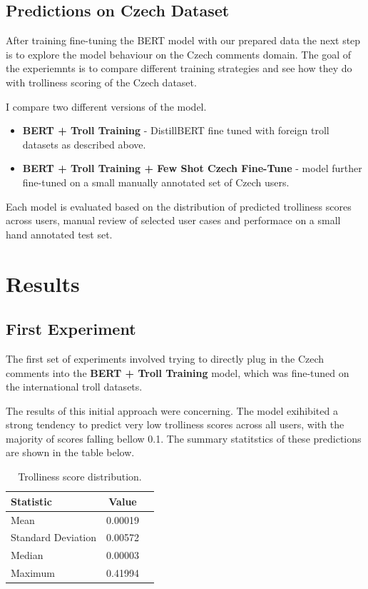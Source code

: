 \documentclass[twoside]{ctuthesis}
\theoremstyle{plain}
\theoremstyle{definition}
\theoremstyle{note}
\begin{document}
\subsection{Predictions on Czech Dataset}
After training fine-tuning the BERT model with our prepared data the next step is to explore the model behaviour on the Czech comments domain. The goal of the experiemnts is to compare different training strategies and see how they do with trolliness scoring of the Czech dataset.\par
I compare two different versions of the model. 
\begin{itemize} 
	\item \textbf{BERT + Troll Training} - DistillBERT fine tuned with foreign troll datasets as described above. 
	\item \textbf{BERT + Troll Training + Few Shot Czech Fine-Tune} - model further fine-tuned on a small manually annotated set of Czech users. 
\end{itemize}
Each model is evaluated based on the distribution of predicted trolliness scores across users, manual review of selected user cases and performace on a small hand annotated test set.

\section{Results}

\subsection{First Experiment}
The first set of experiments involved trying to directly plug in the Czech comments into the \textbf{BERT + Troll Training} model, which was fine-tuned on the international troll datasets.\par
The results of this initial approach were concerning. The model exihibited a strong tendency to predict very low trolliness scores across all users, with the majority of scores falling bellow 0.1. The summary statitstics of these predictions are shown in the table below.

\begin{table}[ht]
    \centering
    \caption{Trolliness score distribution.}
    \begin{tabular}{lcc}
        \toprule
        \textbf{Statistic} & \textbf{Value} \\
        \midrule
        Mean            & 0.00019  \\
        Standard Deviation & 0.00572 \\
        Median     & 0.00003  \\
        Maximum & 0.41994  \\
        \bottomrule
    \end{tabular}
\end{table}
\end{document}
